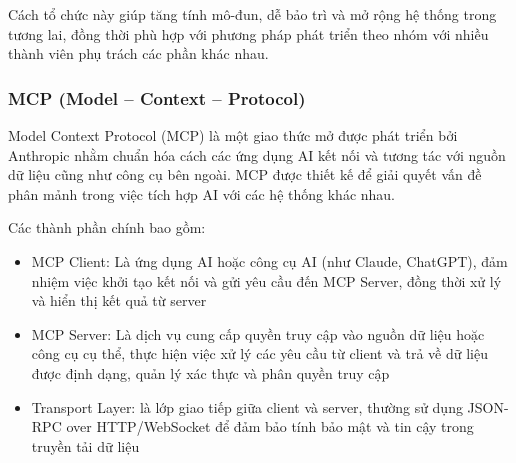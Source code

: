 Cách tổ chức này giúp tăng tính mô-đun, dễ bảo trì và mở rộng hệ thống trong tương lai, đồng thời phù hợp với phương pháp phát triển theo nhóm với nhiều thành viên phụ trách các phần khác nhau.

\subsubsection{MCP (Model – Context – Protocol)}

Model Context Protocol (MCP) là một giao thức mở được phát triển bởi Anthropic nhằm chuẩn hóa cách các ứng dụng AI kết nối và tương tác với nguồn dữ liệu cũng như công cụ bên ngoài. MCP được thiết kế để giải quyết vấn đề phân mảnh trong việc tích hợp AI với các hệ thống khác nhau.

Các thành phần chính bao gồm:
\begin{itemize}
    \item MCP Client: Là ứng dụng AI hoặc công cụ AI (như Claude, ChatGPT), đảm nhiệm việc khởi tạo kết nối và gửi yêu cầu đến MCP Server, đồng thời xử lý và hiển thị kết quả từ server
    \item MCP Server: Là dịch vụ cung cấp quyền truy cập vào nguồn dữ liệu hoặc công cụ cụ thể, thực hiện việc xử lý các yêu cầu từ client và trả về dữ liệu được định dạng, quản lý xác thực và phân quyền truy cập
    \item Transport Layer: là lớp giao tiếp giữa client và server, thường sử dụng JSON-RPC over HTTP/WebSocket để đảm bảo tính bảo mật và tin cậy trong truyền tải dữ liệu
\end{itemize}

